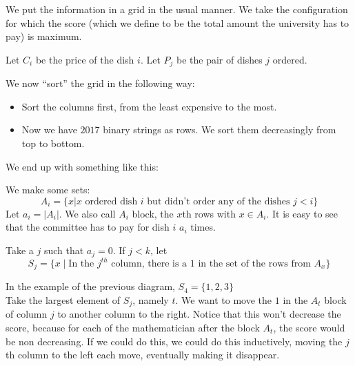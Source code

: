 \begin{solution} We put the information in a grid in the
    usual manner. We take the configuration for which the score (which we
    define to be the total amount the university has to pay) is maximum.

    \begin{solution_def} 
        Let $ C_i $ be the price of the dish $ i $. Let $ P_j
        $ be the pair of dishes $ j $ ordered.  
    \end{solution_def}

    We now ``sort'' the grid in the following way: 

    \begin{itemize} 
        \item Sort the columns first, from the least expensive to the most.  
        \item Now we have $ 2017 $ binary strings as rows. We sort them
            decreasingly from top to bottom.  
    \end{itemize}

    We end up with something like this: 

    \begin{solution_def} 
        We make some sets:\[ A_i=\{x| x \text{ ordered dish }
        i \text{ but didn't order any of the dishes } j<i\} \]Let $ a_i = |A_i| $.
        We also call $ A_i $ block, the $ x $th rows with $ x\in A_i $. It is easy
        to see that the committee has to pay for dish $ i $ $ a_i $ times.
    \end{solution_def}

    Take a $ j $ such that $ a_j=0 $.  If $ j<k $, let 
    \[S_j = \{x\mid \text{In the } j^{th} \text{ column, there
    is a } 1 \text{ in the set of the rows from } A_x \}\]


    In the example of the previous diagram, $ S_4 = \{1, 2, 3\} $\\

    Take the largest element of $ S_j $, namely $ t $. We want to move the $ 1
    $ in the $ A_t $ block of column $ j $ to another column to the right.
    Notice that this won't decrease the score, because for each of the
    mathematician after the block $ A_t $, the score would be non decreasing.
    If we could do this, we could do this inductively, moving the $ j $th
    column to the left each move, eventually making it disappear. \\


\end{solution}
